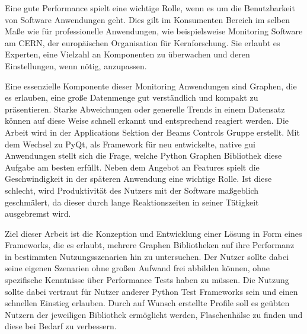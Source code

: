 

\Abstract

Eine gute Performance spielt eine wichtige Rolle, wenn es um die Benutzbarkeit
von Software Anwendungen geht. Dies gilt im Konsumenten Bereich im selben Maße
wie für professionelle Anwendungen, wie beispielsweise Monitoring Software am
CERN, der europäischen Organisation für Kernforschung. Sie erlaubt es Experten,
eine Vielzahl an Komponenten zu überwachen und deren Einstellungen, wenn nötig,
anzupassen.

Eine essenzielle Komponente dieser Monitoring Anwendungen sind Graphen, die es
erlauben, eine große Datenmenge gut verständlich und kompakt zu präsentieren.
Starke Abweichungen oder generelle Trends in einem Datensatz können auf diese
Weise schnell erkannt und entsprechend reagiert werden. Die Arbeit wird in der
Applications Sektion der Beams Controls Gruppe erstellt. Mit dem Wechsel zu
PyQt, als Framework für neu entwickelte, native \gls{gui} Anwendungen stellt
sich die Frage, welche Python Graphen Bibliothek diese Aufgabe am besten
erfüllt. Neben dem Angebot an Features spielt die Geschwindigkeit in der
späteren Anwendung eine wichtige Rolle. Ist diese schlecht, wird Produktivität
des Nutzers mit der Software maßgeblich geschmälert, da dieser durch lange
Reaktionszeiten in seiner Tätigkeit ausgebremst wird.

Ziel dieser Arbeit ist die Konzeption und Entwicklung einer Lösung in Form eines
Frameworks, die es erlaubt, mehrere Graphen Bibliotheken auf ihre Performanz in
bestimmten Nutzungsszenarien hin zu untersuchen. Der Nutzer sollte dabei seine
eigenen Szenarien ohne großen Aufwand frei abbilden können, ohne spezifische
Kenntnisse über Performance Tests haben zu müssen. Die Nutzung sollte dabei
vertraut für Nutzer anderer Python Test Frameworks sein und einen schnellen
Einstieg erlauben. Durch auf Wunsch erstellte Profile soll es geübten Nutzern
der jeweiligen Bibliothek ermöglicht werden, Flaschenhälse zu finden und diese
bei Bedarf zu verbessern.

